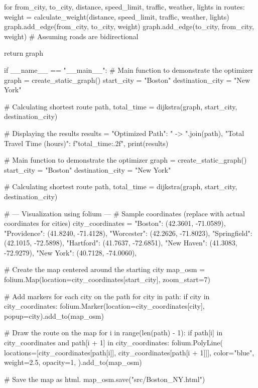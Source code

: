 \documentclass{article}
\begin{document}
\begin{python}
    for from_city, to_city, distance, speed_limit, traffic, weather, lights in routes:
        weight = calculate_weight(distance, speed_limit, traffic, weather, lights)
        graph.add_edge(from_city, to_city, weight)
        graph.add_edge(to_city, from_city, weight)  # Assuming roads are bidirectional

    return graph


if __name__ == "__main__":
    # Main function to demonstrate the optimizer
    graph = create_static_graph()
    start_city = "Boston"
    destination_city = "New York"

    # Calculating shortest route
    path, total_time = dijkstra(graph, start_city, destination_city)

    # Displaying the results
    results = {
        "Optimized Path": " -> ".join(path),
        "Total Travel Time (hours)": f"{total_time:.2f}",
    }
    print(results)

    # Main function to demonstrate the optimizer
    graph = create_static_graph()
    start_city = "Boston"
    destination_city = "New York"

    # Calculating shortest route
    path, total_time = dijkstra(graph, start_city, destination_city)

    # --- Visualization using folium ---
    # Sample coordinates (replace with actual coordinates for cities)
    city_coordinates = {
        "Boston": (42.3601, -71.0589),
        "Providence": (41.8240, -71.4128),
        "Worcester": (42.2626, -71.8023),
        "Springfield": (42.1015, -72.5898),
        "Hartford": (41.7637, -72.6851),
        "New Haven": (41.3083, -72.9279),
        "New York": (40.7128, -74.0060),
    }

    # Create the map centered around the starting city
    map_osm = folium.Map(location=city_coordinates[start_city], zoom_start=7)

    # Add markers for each city on the path
    for city in path:
        if city in city_coordinates:
            folium.Marker(location=city_coordinates[city], popup=city).add_to(map_osm)

    # Draw the route on the map
    for i in range(len(path) - 1):
        if path[i] in city_coordinates and path[i + 1] in city_coordinates:
            folium.PolyLine(
                locations=[city_coordinates[path[i]], city_coordinates[path[i + 1]]],
                color="blue",
                weight=2.5,
                opacity=1,
            ).add_to(map_osm)

    # Save the map as html.
    map_osm.save("src/Boston_NY.html")
\end{python}
\end{document}
